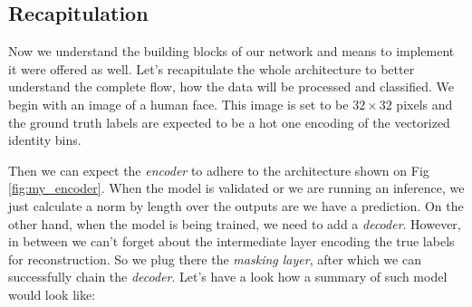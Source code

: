 \subsection{Recapitulation}

Now we understand the building blocks of our network and means to implement it were offered as well. Let's recapitulate the whole architecture to better understand the complete flow, how the data will be processed and classified. We begin with an image of a human face. This image is set to be $32\times32$ pixels and the ground truth labels are expected to be a hot one encoding of the vectorized identity bins.

Then we can expect the \textit{encoder} to adhere to the architecture shown on Fig\,\ref{fig:my_encoder}. When the model is validated or we are running an inference, we just calculate a norm by length over the outputs are we have a prediction. On the other hand, when the model is being trained, we need to add a \textit{decoder}. However, in between we can't forget about the intermediate layer encoding the true labels for reconstruction. So we plug there the \textit{masking layer}, after which we can successfully chain the \textit{decoder}. Let's have a look how a summary of such model would look like:

